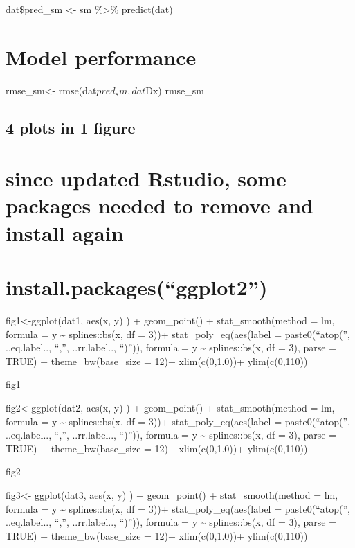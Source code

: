 \documentclass[
]{article}
\begin{document}
dat\$pred\_sm \textless- sm \%\textgreater\% predict(dat)

\hypertarget{model-performance-3}{%
\section{Model performance}\label{model-performance-3}}

rmse\_sm\textless- rmse(dat\(pred_sm, dat\)Dx) rmse\_sm

\hypertarget{plots-in-1-figure}{%
\subsection{4 plots in 1 figure}\label{plots-in-1-figure}}

\hypertarget{since-updated-rstudio-some-packages-needed-to-remove-and-install-again}{%
\section{since updated Rstudio, some packages needed to remove and
install
again}\label{since-updated-rstudio-some-packages-needed-to-remove-and-install-again}}

\hypertarget{install.packagesggplot2}{%
\section{install.packages(``ggplot2'')}\label{install.packagesggplot2}}

fig1\textless-ggplot(dat1, aes(x, y) ) + geom\_point() +
stat\_smooth(method = lm, formula = y \textasciitilde{} splines::bs(x,
df = 3))+ stat\_poly\_eq(aes(label = paste0(``atop('', ..eq.label..,
``,'', ..rr.label.., ``)'')), formula = y \textasciitilde{}
splines::bs(x, df = 3), parse = TRUE) + theme\_bw(base\_size = 12)+
xlim(c(0,1.0))+ ylim(c(0,110))

fig1

fig2\textless-ggplot(dat2, aes(x, y) ) + geom\_point() +
stat\_smooth(method = lm, formula = y \textasciitilde{} splines::bs(x,
df = 3))+ stat\_poly\_eq(aes(label = paste0(``atop('', ..eq.label..,
``,'', ..rr.label.., ``)'')), formula = y \textasciitilde{}
splines::bs(x, df = 3), parse = TRUE) + theme\_bw(base\_size = 12)+
xlim(c(0,1.0))+ ylim(c(0,110))

fig2

fig3\textless- ggplot(dat3, aes(x, y) ) + geom\_point() +
stat\_smooth(method = lm, formula = y \textasciitilde{} splines::bs(x,
df = 3))+ stat\_poly\_eq(aes(label = paste0(``atop('', ..eq.label..,
``,'', ..rr.label.., ``)'')), formula = y \textasciitilde{}
splines::bs(x, df = 3), parse = TRUE) + theme\_bw(base\_size = 12)+
xlim(c(0,1.0))+ ylim(c(0,110))
\end{document}
